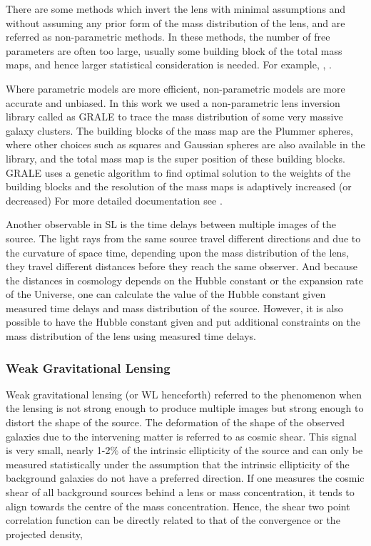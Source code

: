 There are some methods which invert the lens with minimal assumptions and without
assuming any prior form of the mass distribution of the lens, and are referred as
non-parametric methods. In these methods, the number of free parameters are often
too large, usually some building block of the total mass maps, and hence larger
statistical consideration is needed. For example, \cite{}, \cite{}.

Where parametric models are more efficient, non-parametric models are more
accurate and unbiased. In this work we used a non-parametric lens inversion
library called as GRALE \cite{} to trace the mass distribution of some very massive
galaxy clusters. The building blocks of the mass map are the Plummer spheres, where
other choices such as squares and Gaussian spheres are also available in the library, 
and the total mass map is the super position of these building blocks. GRALE uses
a genetic algorithm to find optimal solution to the weights of the building 
blocks and the resolution of the mass maps is adaptively increased (or decreased)
For more detailed documentation see \cite{}.

Another observable in SL is the time delays between multiple images
of the source. The light rays from the same source travel different directions
and due to the curvature of space time, depending upon the mass distribution 
of the lens, they travel different distances before they reach the same 
observer. And because the distances in cosmology depends on the Hubble constant
or the expansion rate of the Universe, one can calculate the value of the
Hubble constant given measured time delays and mass distribution of the source. 
However, it is also possible to have the Hubble constant given and put
additional constraints on the mass distribution of the lens using measured
time delays. 


\subsubsection{Weak Gravitational Lensing}

Weak gravitational lensing (or WL henceforth) referred to the phenomenon when 
the lensing is not strong enough to produce multiple images but strong enough
to distort the shape of the source. The deformation of the shape of the observed galaxies
due to the intervening matter is referred to as cosmic shear. This
signal is very small, nearly 1-2$\%$ of the intrinsic ellipticity of the source 
and can only be measured statistically under the assumption that the intrinsic 
ellipticity of the background galaxies do not have a preferred direction. If one 
measures the cosmic shear of all background sources behind a lens or mass concentration,
it tends to align towards the centre of the mass concentration. Hence, the shear
two point correlation function can be directly related to that of the convergence
or the projected density,

